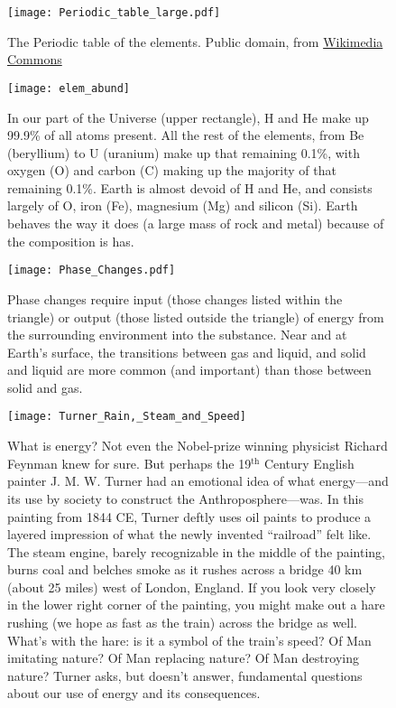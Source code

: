\documentclass[amstex,12pt]{book}
\newcommand{\textsup}[1]{$^{\text{#1}}$}
\begin{document}
\begin{figure}[p]
\centering
\texttt{[image: Periodic\_table\_large.pdf]}%
\caption{The Periodic table of the elements. Public domain, from \href{https://commons.wikimedia.org/wiki/File:Periodic_table_large.png}{Wikimedia Commons}}
\label{fig:pt}
\end{figure}

\begin{figure}[p]
\centering
\texttt{[image: elem\_abund]}%
\caption{In our part of the Universe (upper rectangle), H and He make up 99.9\% of all  atoms present. All the rest of the elements, from Be (beryllium) to U (uranium) make up that remaining 0.1\%, with oxygen (O) and carbon (C) making up the majority of that remaining 0.1\%. Earth is almost devoid of H and He, and consists largely of O, iron (Fe), magnesium (Mg) and silicon (Si). Earth behaves the way it does (a large mass of rock and metal) because of the composition is has.}
\label{fig:elem_abund}
\end{figure}


\begin{figure}[p]
\centering
\texttt{[image: Phase\_Changes.pdf]}%
\caption{Phase changes require input (those changes listed within the triangle) or output (those listed outside the triangle) of energy from the surrounding environment into the substance. Near and at Earth's surface, the transitions between gas and liquid, and solid and liquid are more common (and important) than those between solid and gas.}
\label{fig:phase_changes}
\end{figure}

\begin{figure}[p]
\centering
\texttt{[image: Turner\_Rain,\_Steam\_and\_Speed]}%
\caption{What is energy? Not even the Nobel-prize winning physicist Richard Feynman knew for sure. But perhaps the 19\textsup{th} Century English painter J. M. W. Turner had an emotional idea of what energy---and its use by society to construct the Anthroposphere---was. In this painting from 1844 CE, Turner deftly uses oil paints to produce a layered impression of what the newly invented ``railroad'' felt like. The steam engine, barely recognizable in the middle of the painting, burns coal and belches smoke as it rushes across a bridge 40 km (about 25 miles) west of London, England. If you look very closely in the lower right corner of the painting, you might make out a hare rushing (we hope as fast as the train) across the bridge as well. What's with the hare: is it a symbol of the train's speed? Of Man imitating nature? Of Man replacing nature? Of Man destroying nature? Turner asks, but doesn't answer, fundamental questions about our use of energy and its consequences.}
\label{fig:turner_cute_little_bunny}
\end{figure}
\end{document}
